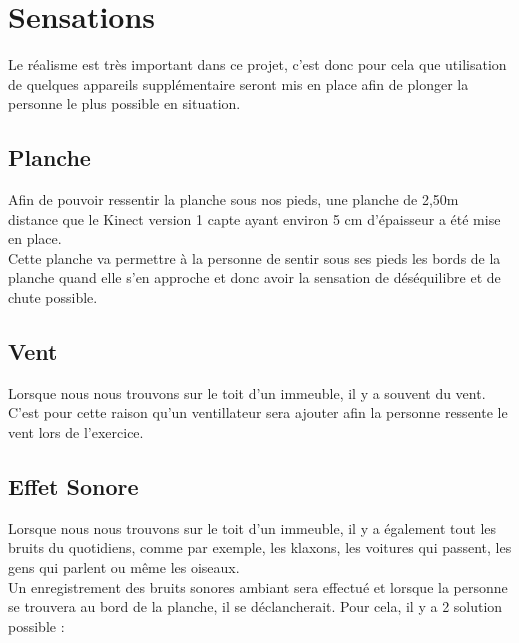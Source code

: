 \chapter{Sensations}
Le réalisme est très important dans ce projet, c'est donc pour cela que utilisation de quelques appareils supplémentaire seront mis en place afin de plonger la personne le plus possible en situation. \\


\section{Planche}
Afin de pouvoir ressentir la planche sous nos pieds, une planche de 2,50m \- distance que le Kinect version 1 capte \- ayant environ 5 cm d'épaisseur a été mise en place. \\
Cette planche va permettre à la personne de sentir sous ses pieds les bords de la planche quand elle s'en approche et donc avoir la sensation de déséquilibre et de chute possible. 


\section{Vent}
Lorsque nous nous trouvons sur le toit d'un immeuble, il y a souvent du vent. C'est pour cette raison qu'un ventillateur sera ajouter afin la personne ressente le vent lors de l'exercice.


\section{Effet Sonore}
Lorsque nous nous trouvons sur le toit d'un immeuble, il y a également tout les bruits du quotidiens, comme par exemple, les klaxons, les voitures qui passent, les gens qui parlent ou même les oiseaux. \\
Un enregistrement des bruits sonores ambiant sera effectué et lorsque la personne se trouvera au bord de la planche, il se déclancherait. Pour cela, il y a 2 solution possible : \\

